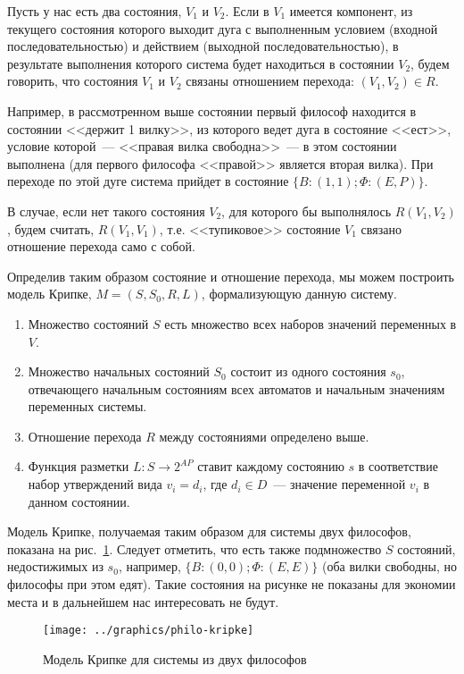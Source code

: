 Пусть у нас есть два состояния, $V_1$ и $V_2$. Если в $V_1$ имеется компонент, из текущего
состояния которого выходит дуга с выполненным условием (входной последовательностью) и
действием (выходной последовательностью), в результате выполнения которого система будет
находиться в состоянии $V_2$, будем говорить, что состояния $V_1$ и $V_2$ связаны
отношением перехода: $(V_1, V_2) \in R$.

Например, в рассмотренном выше состоянии первый философ находится в состоянии
<<держит 1 вилку>>, из которого ведет дуга в состояние <<ест>>, условие которой~---
<<правая вилка свободна>>~--- в этом состоянии выполнена (для первого философа <<правой>>
является вторая вилка). При переходе по этой дуге система прийдет в состояние $\{B: (1, 1);
\Phi: (E, P)\}$.

В случае, если нет такого состояния $V_2$, для которого бы выполнялось $R(V_1, V_2)$,
будем считать, $R(V_1, V_1)$, т.е. <<тупиковое>> состояние $V_1$ связано отношение
перехода само с собой.

Определив таким образом состояние и отношение перехода, мы можем построить модель Крипке,
$M = (S, S_0, R, L)$, формализующую данную систему.
\begin{enumerate}
\item Множество состояний $S$ есть множество всех наборов значений переменных в $V$.
\item Множество начальных состояний $S_0$ состоит из одного состояния $s_0$, отвечающего
  начальным состояниям всех автоматов и начальным значениям переменных системы.
\item Отношение перехода $R$ между состояниями определено выше.
\item Функция разметки $L: S \rightarrow 2^{AP}$ ставит каждому состоянию $s$ в
  соответствие набор утверждений вида $v_i = d_i$, где $d_i \in D$~--- значение переменной
  $v_i$ в данном состоянии.
\end{enumerate}

Модель Крипке, получаемая таким образом для системы двух философов, показана на
рис.~\ref{fig:philo2-kripke}. Следует отметить, что есть также подмножество $S$ состояний,
недостижимых из $s_0$, например, $\{B: (0, 0); \Phi: (E, E)\}$ (оба вилки свободны, но
философы при этом едят). Такие состояния на рисунке не показаны для экономии места и в
дальнейшем нас интересовать не будут.

\begin{figure}[ht]
  \centering
  \texttt{[image: ../graphics/philo-kripke]}
  \caption{Модель Крипке для системы из двух философов}
  \label{fig:philo2-kripke}
\end{figure}


